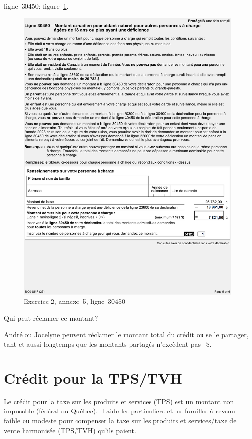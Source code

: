 ligne~30450:
figure~\ref{fig:chap4Exercice2Q11}.
\begin{figure}
	\centering
	\includegraphics[width=.9\textwidth]{exercice/4-2/Q11/30450.png}
	\caption{Exercice 2, annexe~5, ligne~30450}
	\label{fig:chap4Exercice2Q11}
\end{figure}

\begin{sousQuestion}
	Qui peut réclamer ce montant?
\end{sousQuestion}
André ou Jocelyne peuvent réclamer le montant total du crédit ou se le partager, tant et aussi longtemps que les montants partagés n'excèdent pas ~\$.



\section{Crédit pour la TPS/TVH}
\begin{intro}
	Le crédit pour la taxe sur les produits et services (TPS) est un montant non imposable (fédéral ou Québec). Il aide les particuliers et les familles à revenu faible ou modeste pour compenser la taxe sur les produits et services/taxe de vente harmonisée (TPS/TVH) qu'ils paient.
\end{intro}

